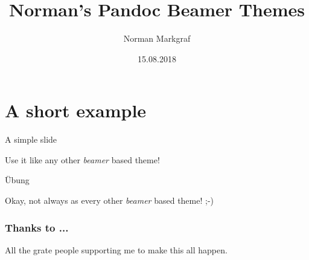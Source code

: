 \documentclass[10pt,ngerman,a4paper]{beamer}
\title{Norman's Pandoc Beamer Themes}
\author{Norman Markgraf}
\date{15.08.2018}
\begin{document}
\frame{\titlepage}

\section{A short example}

\begin{frame}{A simple slide}

    Use it like any other \textit{beamer} based theme!
    
\end{frame}

\begin{frame}{Übung}

   Okay, not always as every other \textit{beamer} based theme! ;-)
   
\end{frame}

\begin{frame}
	\frametitle{Thanks to ...}

	All the grate people supporting me to make this all happen.

\end{frame}
\end{document}
